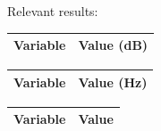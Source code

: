 Relevant results:

\begin{center}
\begin{tabular}{|l|r|}
  \hline    
  {\bf Variable} & {\bf Value (dB)} \\ \hline
  
\end{tabular}
\end{center}

\begin{center}
\begin{tabular}{|l|r|}
  \hline    
  {\bf Variable} & {\bf Value (Hz)} \\ \hline
  
\end{tabular}
\end{center}

\begin{center}
\begin{tabular}{|l|r|}
  \hline    
  {\bf Variable} & {\bf Value} \\ \hline
  
\end{tabular}
\end{center}